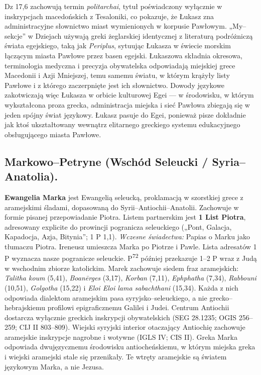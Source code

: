 Dz 17,6 zachowują termin \textit{politarchai}, tytuł poświadczony wyłącznie w inskrypcjach macedońskich z Tesaloniki, co pokazuje, że Łukasz zna administracyjne słownictwo miast wymienionych w korpusie Pawłowym.
„My–sekcje” w Dziejach używają greki żeglarskiej identycznej z literaturą podróżniczą świata egejskiego, taką jak \textit{Periplus}, sytuując Łukasza w świecie morskim łączącym miasta Pawłowe przez basen egejski.
Łukaszowa składnia okresowa, terminologia medyczna i precyzja obywatelska odpowiadają miejskiej grece Macedonii i Azji Mniejszej, temu samemu światu, w którym krążyły listy Pawłowe i z którego zaczerpnięte jest ich słownictwo.
Dowody językowe zakotwiczają więc Łukasza w orbicie kulturowej Egei — w środowisku, w którym wykształcona proza grecka, administracja miejska i sieć Pawłowa zbiegają się w jeden spójny świat językowy.
Łukasz pasuje do Egei, ponieważ pisze dokładnie jak ktoś ukształtowany wewnątrz elitarnego greckiego systemu edukacyjnego obsługującego miasta Pawłowe.

\subsection{Markowo–Petryne (Wschód Seleucki / Syria–Anatolia).}
\textbf{Ewangelia Marka} jest Ewangelią seleucką, proklamacją w szorstkiej grece z aramejskimi śladami, dopasowaną do Syrii–Antiochii–Anatolii.
Zachowuje w formie pisanej przepowiadanie Piotra.
Listem partnerskim jest \textbf{1 List Piotra}, adresowany explicite do prowincji pogranicza seleuckiego („Pont, Galacja, Kapadocja, Azja, Bitynia”; 1 P 1,1).
\emph{Wczesne świadectwa:} Papias o Marku jako tłumaczu Piotra.
Ireneusz umieszcza Marka po Piotrze i Pawle.
Lista adresatów 1 P wyznacza nasze pogranicze seleuckie.
P\textsuperscript{72} później przekazuje 1–2 P wraz z Judą w wschodnim zbiorze katolickim.
Marek zachowuje siedem fraz aramejskich: \textit{Talitha koum} (5,41), \textit{Boanērges} (3,17), \textit{Korban} (7,11), \textit{Ephphatha} (7,34), \textit{Rabbouni} (10,51), \textit{Golgotha} (15,22) i \textit{Eloi Eloi lama sabachthani} (15,34).
Każda z nich odpowiada dialektom aramejskim pasa syryjsko–seleuckiego, a nie grecko–hebrajskiemu profilowi epigraficznemu Galilei i Judei.
Centrum Antiochii dostarcza wyłącznie greckich inskrypcji obywatelskich (SEG 28.1235; OGIS 256–259; CIJ II 803–809).
Wiejski syryjski interior otaczający Antiochię zachowuje aramejskie inskrypcje nagrobne i wotywne (IGLS IV; CIS II).
Greka Marka odpowiada dwujęzycznemu środowisku antiocheńskiemu, w którym miejska greka i wiejski aramejski stale się przenikały.
Te wtręty aramejskie są światem językowym Marka, a nie Jezusa.

